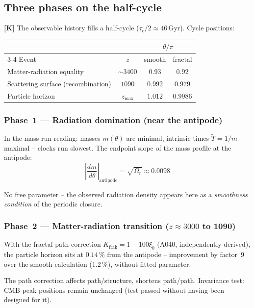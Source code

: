 \subsection{Three phases on the half-cycle}

\textbf{[K]} The observable history fills a half-cycle
($\tau_c/2 \approx 46$\,Gyr). Cycle positions:

\begin{center}
	\small
	\begin{tabular}{lccc}
		\toprule
		& & \multicolumn{2}{c}{$\theta/\pi$} \\
		\cmidrule(l){3-4}
		Event & $z$ & smooth & fractal \\
		\midrule
		Matter-radiation equality & $\sim\!3400$ & $0.93$ & $0.92$ \\
		Scattering surface (recombination) & $1090$ & $0.992$ & $\mathbf{0.979}$ \\
		Particle horizon & $z_\text{max}$ & $1.012$ & $\mathbf{0.9986}$ \\
		\bottomrule
	\end{tabular}
\end{center}

\subsubsection{Phase~1 --- Radiation domination (near the antipode)}

In the mass-run reading: masses $m(\theta)$ are minimal,
intrinsic times $\tilde{T} = 1/m$ maximal -- clocks run slowest.
The endpoint slope of the mass profile at the antipode:
\[
\left|\frac{dm}{d\theta}\right|_\text{antipode}
= \sqrt{\Omega_r} \approx 0.0098
\]

No free parameter -- the observed radiation density appears here
as a \emph{smoothness condition} of the periodic closure.

\subsubsection{Phase~2 --- Matter-radiation transition ($z \approx 3000$ to 1090)}

With the fractal path correction $K_\text{frak} = 1-100\xi_0$ (A040,
independently derived), the particle horizon sits at $0.14\,\%$
from the antipode -- improvement by factor~9 over the smooth
calculation ($1.2\,\%$), without fitted parameter.

The path correction affects path/structure, shortens path/path.
Invariance test: CMB peak positions remain unchanged
(test passed without having been designed for it).

